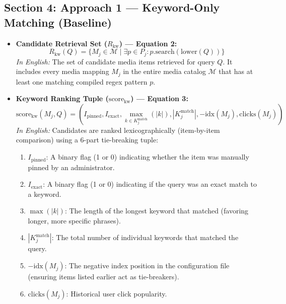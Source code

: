 \documentclass{article}
\begin{document}
\subsection{Section 4: Approach 1 --- Keyword-Only Matching (Baseline)}
\begin{itemize}
    \item \textbf{Candidate Retrieval Set ($R_{\text{kw}}$) --- Equation 2:}
    $$R_{\text{kw}}(Q) = \{ M_j \in \mathcal{M} \mid \exists p \in P_j : p.\text{search}(\text{lower}(Q)) \}$$
    \textit{In English:} The set of candidate media items retrieved for query $Q$. It includes every media mapping $M_j$ in the entire media catalog $\mathcal{M}$ that has at least one matching compiled regex pattern $p$.

    \item \textbf{Keyword Ranking Tuple ($\text{score}_{\text{kw}}$) --- Equation 3:}
    $$\text{score}_{\text{kw}}(M_j, Q) = \left( I_{\text{pinned}}, I_{\text{exact}}, \max_{k \in K^{\text{match}}_j} (|k|), |K^{\text{match}}_j|, -\text{idx}(M_j), \text{clicks}(M_j) \right)$$
    \textit{In English:} Candidates are ranked lexicographically (item-by-item comparison) using a 6-part tie-breaking tuple:
    \begin{enumerate}
        \item $I_{\text{pinned}}$: A binary flag (1 or 0) indicating whether the item was manually pinned by an administrator.
        \item $I_{\text{exact}}$: A binary flag (1 or 0) indicating if the query was an exact match to a keyword.
        \item $\max(|k|)$: The length of the longest keyword that matched (favoring longer, more specific phrases).
        \item $|K^{\text{match}}_j|$: The total number of individual keywords that matched the query.
        \item $-\text{idx}(M_j)$: The negative index position in the configuration file (ensuring items listed earlier act as tie-breakers).
        \item $\text{clicks}(M_j)$: Historical user click popularity.
    \end{enumerate}
\end{itemize}
\end{document}
